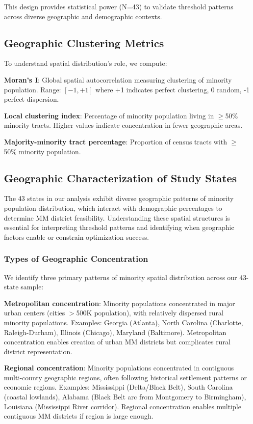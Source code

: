 This design provides statistical power (N=43) to validate threshold patterns across diverse geographic and demographic contexts.

\subsection{Geographic Clustering Metrics}

To understand spatial distribution's role, we compute:

\textbf{Moran's I}: Global spatial autocorrelation measuring clustering of minority population. Range: $[-1, +1]$ where +1 indicates perfect clustering, 0 random, -1 perfect dispersion.

\textbf{Local clustering index}: Percentage of minority population living in $\geq$50\% minority tracts. Higher values indicate concentration in fewer geographic areas.

\textbf{Majority-minority tract percentage}: Proportion of census tracts with $\geq$50\% minority population.

\subsection{Geographic Characterization of Study States}

The 43 states in our analysis exhibit diverse geographic patterns of minority population distribution, which interact with demographic percentages to determine MM district feasibility. Understanding these spatial structures is essential for interpreting threshold patterns and identifying when geographic factors enable or constrain optimization success.

\subsubsection{Types of Geographic Concentration}

We identify three primary patterns of minority spatial distribution across our 43-state sample:

\textbf{Metropolitan concentration}: Minority populations concentrated in major urban centers (cities $>$500K population), with relatively dispersed rural minority populations. Examples: Georgia (Atlanta), North Carolina (Charlotte, Raleigh-Durham), Illinois (Chicago), Maryland (Baltimore). Metropolitan concentration enables creation of urban MM districts but complicates rural district representation.

\textbf{Regional concentration}: Minority populations concentrated in contiguous multi-county geographic regions, often following historical settlement patterns or economic regions. Examples: Mississippi (Delta/Black Belt), South Carolina (coastal lowlands), Alabama (Black Belt arc from Montgomery to Birmingham), Louisiana (Mississippi River corridor). Regional concentration enables multiple contiguous MM districts if region is large enough.

